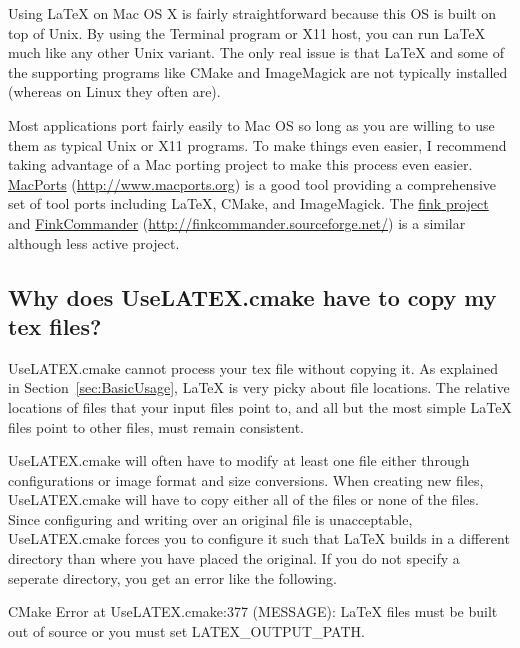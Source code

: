 \documentclass{article}
\newcommand*{\textfile}[1]{\textsf{#1}}
\newcommand*{\UseLATEX}{\textfile{UseLATEX.cmake}\xspace}
\newcommand*{\latex}{\LaTeX\xspace}
\begin{document}
  Using \latex on Mac OS X is fairly straightforward because this OS is
  built on top of Unix.  By using the Terminal program or X11 host, you can
  run \latex much like any other Unix variant.  The only real issue is that
  \latex and some of the supporting programs like CMake and ImageMagick are
  not typically installed (whereas on Linux they often are).

  Most applications port fairly easily to Mac OS so long as you are willing
  to use them as typical Unix or X11 programs.  To make things even easier,
  I recommend taking advantage of a Mac porting project to make this
  process even easier.  \href{http://www.macports.org}{MacPorts}
  (\href{http://www.macports.org}{http://www.macports.org}) is a good tool
  providing a comprehensive set of tool ports including \latex, CMake, and
  ImageMagick.  The \href{http://www.finkproject.org/}{fink project} and
  \href{http://finkcommander.sourceforge.net/}{FinkCommander}
  (\href{http://finkcommander.sourceforge.net/}{http://finkcommander.sourceforge.net/})
  is a similar although less active project.

  \subsection{Why does \UseLATEX have to copy my tex files?}
  \label{sec:Why_does_UseLATEX_have_to_copy_my_tex_files}

  \UseLATEX cannot process your tex file without copying it.  As explained
  in Section~\ref{sec:BasicUsage}, \latex is very picky about file locations.
  The relative locations of files that your input files point to, and all
  but the most simple \latex files point to other files, must remain
  consistent.

  \UseLATEX will often have to modify at least one file either through
  configurations or image format and size conversions.  When creating new
  files, \UseLATEX will have to copy either all of the files or none of the
  files.  Since configuring and writing over an original file is
  unacceptable, \UseLATEX forces you to configure it such that \latex
  builds in a different directory than where you have placed the original.
  If you do not specify a seperate directory, you get an error like the
  following.

  \begin{CodeListing}
CMake Error at UseLATEX.cmake:377 (MESSAGE):
  LaTeX files must be built out of source or you must set
  LATEX_OUTPUT_PATH.
  \end{CodeListing}
\end{document}
